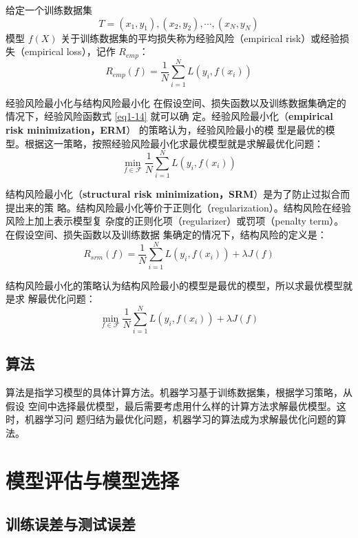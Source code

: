 给定一个训练数据集
$$T = {(x_1, y_1), (x_2, y_2), \cdots, (x_N, y_N)}$$
模型 $f(X)$ 关于训练数据集的平均损失称为经验风险（empirical risk）或经验损失（empirical
loss），记作 $R_{emp}$：
\begin{equation}
    \label{eq1-14}
    R_{emp}(f)=\frac{1}{N}\sum_{i=1}^{N}L(y_i, f(x_i))
\end{equation}

经验风险最小化与结构风险最小化
在假设空间、损失函数以及训练数据集确定的情况下，经验风险函数式 \autoref{eq1-14} 就可以确
定。经验风险最小化（\textbf{empirical risk minimization，ERM}） 的策略认为，经验风险最小的模
型是最优的模型。根据这一策略，按照经验风险最小化求最优模型就是求解最优化问题：
\begin{equation}
    \min_{f\in\mathcal{F}}\frac{1}{N}\sum_{i=1}^{N}L(y_i, f(x_i))
\end{equation}

结构风险最小化（\textbf{structural risk minimization，SRM}）是为了防止过拟合而提出来的策
略。结构风险最小化等价于正则化（regularization）。结构风险在经验风险上加上表示模型复
杂度的正则化项（regularizer）或罚项（penalty term）。在假设空间、损失函数以及训练数据
集确定的情况下，结构风险的定义是：
\begin{equation}\label{eq1-16}
    R_{srm}(f)=\frac{1}{N}\sum_{i=1}^{N}L(y_i, f(x_i))+\lambda J(f)
\end{equation}

结构风险最小化的策略认为结构风险最小的模型是最优的模型，所以求最优模型就是求
解最优化问题：
\begin{equation}
    \min_{f\in\mathcal{F}}\frac{1}{N}\sum_{i=1}^{N}L(y_i, f(x_i))+\lambda J(f)
\end{equation}
\subsection{算法}
算法是指学习模型的具体计算方法。机器学习基于训练数据集，根据学习策略，从假设
空间中选择最优模型，最后需要考虑用什么样的计算方法求解最优模型。这时，机器学习问
题归结为最优化问题，机器学习的算法成为求解最优化问题的算法。
\section{模型评估与模型选择}
\subsection{训练误差与测试误差}

